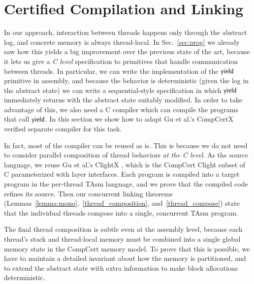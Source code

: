 
\section{Certified Compilation and Linking}
\label{sec:comp}

In our approach, interaction between threads happens only through the 
abstract log, and concrete memory is always thread-local.
In Sec.~\ref{sec:prog} we already saw how this yields a big
improvement over the previous state of the art, because it lets us
give a \emph{C level} specification to primitives that handle
communication between threads. In particular, we can write the
implementation of the $\mathsf{yield}$ primitive in assembly, and because the
behavior is deterministic (given the log in the abstract state) we can
write a sequential-style specification in which $\mathsf{yield}$ immediately
returns with the abstract state suitably modified.
In order to take advantage of this, we also need a C compiler which
can compile the programs that call $\mathsf{yield}$. 
In this section we show how to adapt Gu et al.'s CompCertX verified
separate compiler \cite[\S 6]{dscal15} for this task.

In fact, most of the compiler can be reused as is. This is because we
do not need to consider parallel composition of thread behaviors
\emph{at the C level}. As the source language, we reuse Gu et al.'s
ClightX \cite[\S 4]{dscal15}, which is the CompCert
Clight subset of C parameterized with layer interfaces.
Each program is compiled into a
target program in the per-thread TAsm language, and we prove that the
compiled code refines its source. Then our concurrent linking
theorems (Lemmas~\ref{lemma:mono},~\ref{thread_composition}, and~\ref{thread_compose})
state that the individual threads compose into a
single, concurrent TAsm program. %

The final thread composition is subtle even at the assembly level,
because each thread's stack and thread-local memory must be combined
into a single global memory state in the CompCert memory model. To
prove that this is possible, we have to maintain a detailed invariant
about how the memory is partitioned, and to extend the abstract state
with extra information to make block allocations deterministic.


